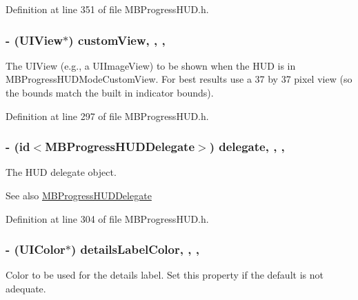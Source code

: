 Definition at line 351 of file M\+B\+Progress\+H\+U\+D.\+h.

\hypertarget{interface_m_b_progress_h_u_d_a78f89e05d797a46bf9b41a5dfd1f5d4a}{
\subsubsection[{custom\+View}]{\setlength{\rightskip}{0pt plus 5cm}-\/ (U\+I\+View$\ast$) custom\+View\hspace{0.3cm}{\ttfamily [read]}, {\ttfamily [write]}, {\ttfamily [atomic]}, {\ttfamily [assign]}}}\label{interface_m_b_progress_h_u_d_a78f89e05d797a46bf9b41a5dfd1f5d4a}
The U\+I\+View (e.\+g., a U\+I\+Image\+View) to be shown when the H\+U\+D is in M\+B\+Progress\+H\+U\+D\+Mode\+Custom\+View. For best results use a 37 by 37 pixel view (so the bounds match the built in indicator bounds). 

Definition at line 297 of file M\+B\+Progress\+H\+U\+D.\+h.

\hypertarget{interface_m_b_progress_h_u_d_ad6fee32939fa55fc1a341aba117aa28f}{
\subsubsection[{delegate}]{\setlength{\rightskip}{0pt plus 5cm}-\/ (id$<${\bf M\+B\+Progress\+H\+U\+D\+Delegate}$>$) delegate\hspace{0.3cm}{\ttfamily [read]}, {\ttfamily [write]}, {\ttfamily [atomic]}, {\ttfamily [assign]}}}\label{interface_m_b_progress_h_u_d_ad6fee32939fa55fc1a341aba117aa28f}
The H\+U\+D delegate object.

\begin{DoxySeeAlso}{See also}
\hyperlink{protocol_m_b_progress_h_u_d_delegate-p}{M\+B\+Progress\+H\+U\+D\+Delegate} 
\end{DoxySeeAlso}


Definition at line 304 of file M\+B\+Progress\+H\+U\+D.\+h.

\hypertarget{interface_m_b_progress_h_u_d_ace929217bd7673159f063d5b8e80b080}{
\subsubsection[{details\+Label\+Color}]{\setlength{\rightskip}{0pt plus 5cm}-\/ (U\+I\+Color$\ast$) details\+Label\+Color\hspace{0.3cm}{\ttfamily [read]}, {\ttfamily [write]}, {\ttfamily [atomic]}, {\ttfamily [assign]}}}\label{interface_m_b_progress_h_u_d_ace929217bd7673159f063d5b8e80b080}
Color to be used for the details label. Set this property if the default is not adequate. 

